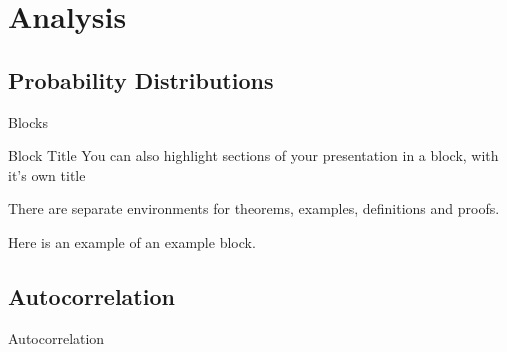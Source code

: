 \documentclass{beamer}
\begin{document}
%

\section{Analysis}

\subsection{Probability Distributions}

\begin{frame}{Blocks}
\begin{block}{Block Title}
You can also highlight sections of your presentation in a block, with it's own title
\end{block}
\begin{theorem}
There are separate environments for theorems, examples, definitions and proofs.
\end{theorem}
\begin{example}
Here is an example of an example block.
\end{example}
\end{frame}

\subsection{Autocorrelation}
\begin{frame}{Autocorrelation}

\end{frame}
\end{document}
